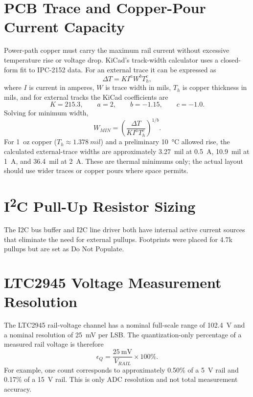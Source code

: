 \section{PCB Trace and Copper-Pour Current Capacity}
\label{sec:trace-width}
Power-path copper must carry the maximum rail current without excessive
temperature rise or voltage drop. KiCad's track-width calculator uses a
closed-form fit to IPC-2152 data. For an external trace it can be expressed as
\begin{equation}
    \Delta T = K I^a W^b T_h^c,
\end{equation}
where $I$ is current in amperes, $W$ is trace width in mils, $T_h$ is copper
thickness in mils, and for external tracks the KiCad coefficients are
\begin{equation}
    K=215.3,\qquad a=2,\qquad b=-1.15,\qquad c=-1.0.
\end{equation}
Solving for minimum width,
\begin{equation}
    W_{MIN}=\left(\frac{\Delta T}
    {K I^a T_h^c}\right)^{1/b}.
\end{equation}
For \SI{1}{oz} copper ($T_h\approx\SI{1.378}{mil}$) and a preliminary
\SI{10}{\celsius} allowed rise, the calculated external-trace widths are
approximately \SI{3.27}{mil} at \SI{0.5}{A}, \SI{10.9}{mil} at \SI{1}{A}, and
\SI{36.4}{mil} at \SI{2}{A}. These are thermal minimums only; the actual layout
should use wider traces or copper pours where space permits.

\section{I\texorpdfstring{\textsuperscript{2}}{2}C Pull-Up Resistor Sizing}
\label{sec:i2c-pullups}
The I2C bus buffer and I2C line driver both have internal active current sources that eliminate the need for external pullups. Footprints were placed for 4.7k pullups but are set as Do Not Populate.

\section{LTC2945 Voltage Measurement Resolution}
The LTC2945 rail-voltage channel has a nominal full-scale range of
\SI{102.4}{\volt} and a nominal resolution of \SI{25}{\milli\volt} per LSB.
The quantization-only percentage of a measured rail voltage is therefore
\begin{equation}
    \epsilon_Q=\frac{\SI{25}{\milli\volt}}{V_{RAIL}}\times100\%.
\end{equation}
For example, one count corresponds to approximately 0.50\% of a \SI{5}{\volt}
rail and 0.17\% of a \SI{15}{\volt} rail.
This is only ADC resolution and not total measurement
accuracy.

